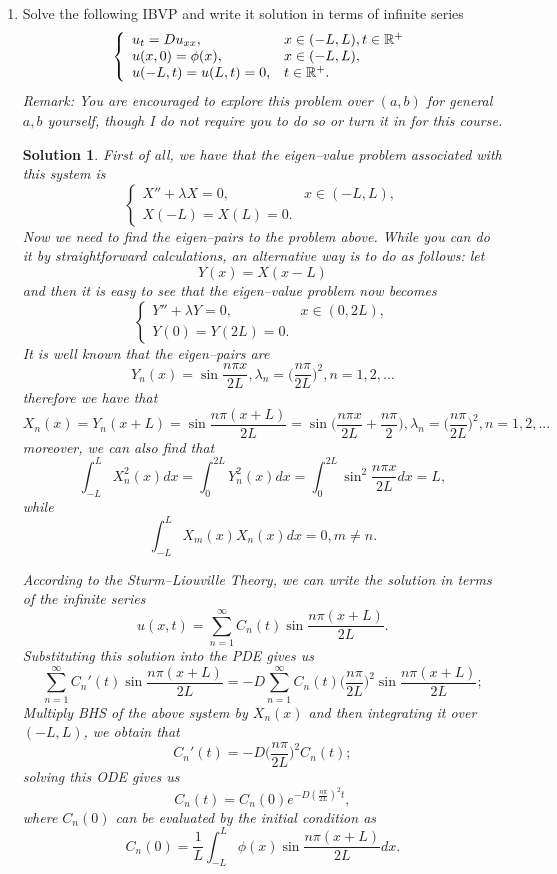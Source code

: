 \documentclass[6pt]{article}
\newtheorem{solution}{Solution}
\numberwithin{equation}{section}
\def\mathbb{\Bbb}
\begin{document}
\begin{enumerate}
\item Solve the following IBVP and write it solution in terms of infinite series
\begin{equation}
\left\{
\begin{array}{ll}
u_t=Du_{xx},& x\in(-L,L),t\in\mathbb R^+\\
u(x,0)=\phi(x),&x\in(-L,L),\\
u(-L,t)=u(L,t)=0, &t\in\mathbb R^+.
\end{array}
\right.
\end{equation}
\emph{Remark:  You are encouraged to explore this problem over $(a,b)$ for general $a,b$ yourself, though I do not require you to do so or turn it in for this course.}
\begin{solution}
First of all, we have that the eigen--value problem associated with this system is
\begin{equation*}
\left\{
\begin{array}{ll}
X''+\lambda X=0,& x\in(-L,L),\\
X(-L)=X(L)=0. &
\end{array}
\right.
\end{equation*}
Now we need to find the eigen--pairs to the problem above.  While you can do it by straightforward calculations, an alternative way is to do as follows:
let \[Y(x)=X(x-L)\]
and then it is easy to see that the eigen--value problem now becomes
\begin{equation*}
\left\{
\begin{array}{ll}
Y''+\lambda Y=0,& x\in(0,2L),\\
Y(0)=Y(2L)=0. &
\end{array}
\right.
\end{equation*}
It is well known that the eigen--pairs are
\[Y_n(x)=\sin \frac{n\pi x}{2L},\lambda_n=\Big(\frac{n\pi}{2L}\Big)^2,n=1,2,...\]
therefore we have that
\[X_n(x)=Y_n(x+L)=\sin \frac{n\pi (x+L)}{2L}=\sin \Big(\frac{n\pi x}{2L}+\frac{n\pi}{2}\Big),\lambda_n=\Big(\frac{n\pi}{2L}\Big)^2,n=1,2,...\]
moreover, we can also find that
\[\int_{-L}^L X^2_n(x)dx=\int_0^{2L}Y^2_n(x)dx=\int_0^{2L}\sin^2 \frac{n\pi x}{2L}dx=L,\]
while \[\int_{-L}^L X_m(x)X_n(x)dx=0,m\neq n.\]

According to the Sturm--Liouville Theory, we can write the solution in terms of the infinite series
\[u(x,t)=\sum_{n=1}^\infty C_n(t) \sin \frac{n\pi (x+L)}{2L}.\]
Substituting this solution into the PDE gives us
\[\sum_{n=1}^\infty C_n'(t) \sin \frac{n\pi (x+L)}{2L}=-D\sum_{n=1}^\infty C_n(t) \Big(\frac{n\pi}{2L}\Big)^2\sin \frac{n\pi (x+L)}{2L};\]
Multiply BHS of the above system by $X_n(x)$ and then integrating it over $(-L,L)$, we obtain that
\[C_n'(t)=- D \Big(\frac{n\pi}{2L}\Big)^2C_n(t);\]
solving this ODE gives us
\[C_n(t)=C_n(0)e^{-D(\frac{n\pi}{2L})^2t},\]
where $C_n(0)$ can be evaluated by the initial condition as
\[C_n(0)=\frac{1}{L}\int_{-L}^L \phi(x) \sin \frac{n\pi (x+L)}{2L}dx.\]
\end{solution}



\end{enumerate}
\end{document}
